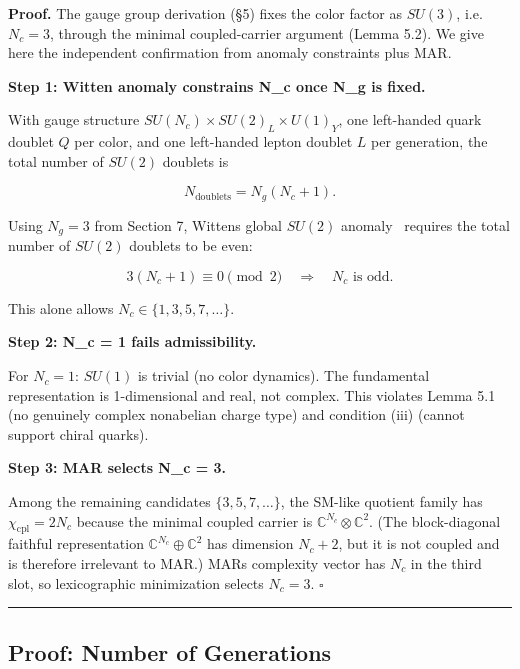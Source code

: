 \textbf{Proof.} The gauge group derivation (\S{}5) fixes the color factor as \(SU(3)\), i.e. \(N_c = 3\), through the minimal coupled-carrier argument (Lemma 5.2). We give here the independent confirmation from anomaly constraints plus MAR.

\textbf{Step 1: Witten anomaly constrains N\_c once N\_g is fixed.}

With gauge structure \(SU(N_c) \times SU(2)_L \times U(1)_Y\), one left-handed quark doublet \(Q\) per color, and one left-handed lepton doublet \(L\) per generation, the total number of \(SU(2)\) doublets is

\[N_{\mathrm{doublets}} = N_g(N_c + 1).\]

Using \(N_g = 3\) from Section 7, Witten\textquotesingle s global \(SU(2)\) anomaly~\cite{witten82} requires the total number of \(SU(2)\) doublets to be even:

\[3(N_c + 1) \equiv 0 \pmod{2} \quad \Longrightarrow \quad N_c \text{ is odd}.\]

This alone allows \(N_c \in \{1, 3, 5, 7, \ldots\}\).

\textbf{Step 2: N\_c = 1 fails admissibility.}

For \(N_c = 1\): \(SU(1)\) is trivial (no color dynamics). The fundamental representation is 1-dimensional and real, not complex. This violates Lemma 5.1 (no genuinely complex nonabelian charge type) and condition (iii) (cannot support chiral quarks).

\textbf{Step 3: MAR selects N\_c = 3.}

Among the remaining candidates \(\{3, 5, 7, \ldots\}\), the SM-like quotient family has \(\chi_{\mathrm{cpl}} = 2N_c\) because the minimal coupled carrier is \(\mathbb{C}^{N_c} \otimes \mathbb{C}^2\). (The block-diagonal faithful representation \(\mathbb{C}^{N_c} \oplus \mathbb{C}^2\) has dimension \(N_c + 2\), but it is not coupled and is therefore irrelevant to MAR.) MAR\textquotesingle s complexity vector has \(N_c\) in the third slot, so lexicographic minimization selects \(N_c = 3\). \(\square\)

\begin{center}\rule{0.5\linewidth}{0.5pt}\end{center}

\subsection{Proof: Number of Generations}\label{7-proof-number-of-generations}

